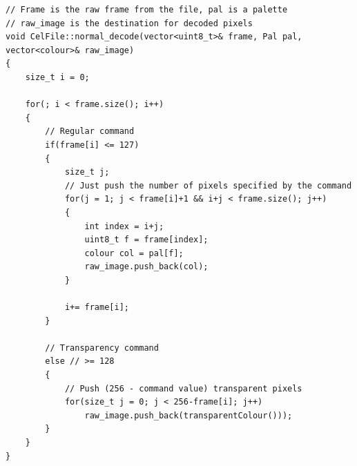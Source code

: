 \documentclass[a4paper]{article}
\begin{document}
	\begin{lstlisting}
// Frame is the raw frame from the file, pal is a palette
// raw_image is the destination for decoded pixels
void CelFile::normal_decode(vector<uint8_t>& frame, Pal pal, vector<colour>& raw_image)
{
    size_t i = 0;
    
    for(; i < frame.size(); i++)
    {   
        // Regular command
        if(frame[i] <= 127)
        {    
            size_t j;
            // Just push the number of pixels specified by the command
            for(j = 1; j < frame[i]+1 && i+j < frame.size(); j++)
            {
                int index = i+j;
                uint8_t f = frame[index];
                colour col = pal[f];
                raw_image.push_back(col);
            }
    
            i+= frame[i];
        }

        // Transparency command
        else // >= 128
        {
            // Push (256 - command value) transparent pixels
            for(size_t j = 0; j < 256-frame[i]; j++)
                raw_image.push_back(transparentColour()));
        }
    }
}
	\end{lstlisting}
	\newpage
\end{document}

